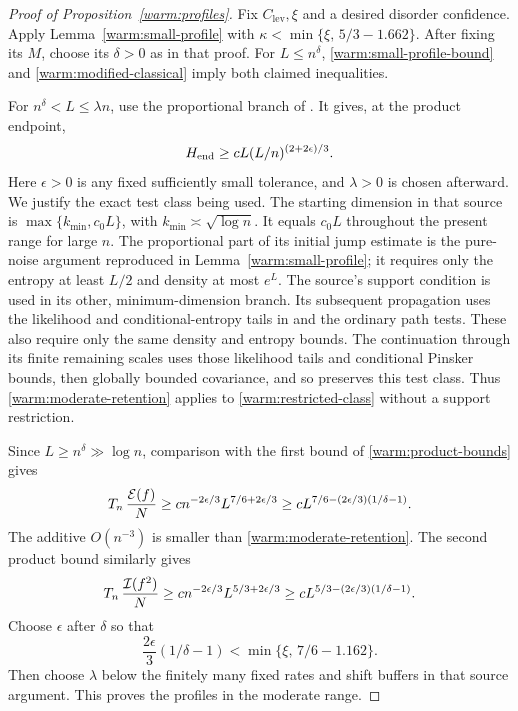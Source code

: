 \begin{proof}[Proof of Proposition~\ref{warm:profiles}]
Fix \(C_{\mathrm{lev}},\xi\) and a desired disorder confidence.  Apply
Lemma~\ref{warm:small-profile} with
\(\kappa<\min\{\xi,\,5/3-1.662\}\).  After fixing its \(M\), choose
its \(\delta>0\) as in that proof.  For \(L\le n^\delta\),
\eqref{warm:small-profile-bound} and
\eqref{warm:modified-classical} imply both claimed inequalities.

For \(n^\delta<L\le\lambda n\), use the proportional branch of
\cite[Equation~(19.16) and Section~19.4]{CM}.  It gives, at the
product endpoint,
\begin{equation}
 H_{\rm end}\ge cL(L/n)^{(2+2\epsilon)/3}.                \label{warm:moderate-retention}
\end{equation}
Here \(\epsilon>0\) is any fixed sufficiently small tolerance,
and \(\lambda>0\) is chosen afterward.  We justify the exact test
class being used.  The starting dimension in that source is
\(\max\{k_{\min},c_0L\}\), with \(k_{\min}\asymp\sqrt{\log n}\).
It equals \(c_0L\) throughout the present range for large \(n\).
The proportional part of its initial jump estimate is the pure-noise
argument reproduced in Lemma~\ref{warm:small-profile}; it requires only
the entropy at least \(L/2\) and density at most \(e^L\).
The source's support condition is used in its other, minimum-dimension
branch.  Its subsequent propagation uses the likelihood and
conditional-entropy tails in \cite[Equation~(19.8)]{CM} and the
ordinary path tests.  These also require only the same density and
entropy bounds.  The continuation through its finite remaining
scales uses those likelihood tails and conditional Pinsker bounds,
then globally bounded covariance, and so preserves this test class.
Thus \eqref{warm:moderate-retention} applies to
\eqref{warm:restricted-class} without a support restriction.

Since \(L\ge n^\delta\gg\log n\), comparison with the first bound
of \eqref{warm:product-bounds} gives
\[
 T_n\,\frac{\mathcal E(f)}N
 \ge c n^{-2\epsilon/3}L^{7/6+2\epsilon/3}
 \ge c L^{7/6-(2\epsilon/3)(1/\delta-1)}.
\]
The additive \(O(n^{-3})\) is smaller than
\eqref{warm:moderate-retention}.  The second product bound similarly
gives
\[
 T_n\,\frac{\mathcal I(f^2)}N
 \ge c n^{-2\epsilon/3}L^{5/3+2\epsilon/3}
 \ge c L^{5/3-(2\epsilon/3)(1/\delta-1)}.
\]
Choose \(\epsilon\) after \(\delta\) so that
\[
 \frac{2\epsilon}{3}(1/\delta-1)
       <\min\{\xi,\,7/6-1.162\}.
\]
Then choose \(\lambda\) below the finitely many fixed rates and
shift buffers in that source argument.  This proves the profiles
in the moderate range.


\end{proof}
